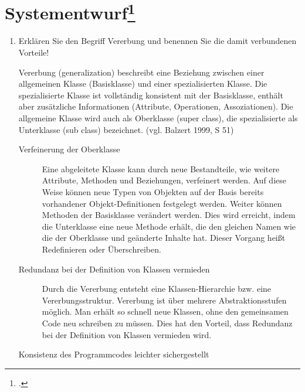 \documentclass{bschlangaul-aufgabe}
\begin{document}

\section{Systementwurf\footcite[Thema 1 Aufgabe 5]{examen:66112:2006:09}}

\begin{enumerate}


\item Erklären Sie den Begriff Vererbung  und benennen
Sie die damit verbundenen Vorteile!

\begin{bAntwort}
Vererbung (generalization) beschreibt eine Beziehung zwischen einer
allgemeinen Klasse (Basisklasse) und einer spezialisierten Klasse. Die
spezialisierte Klasse ist vollständig konsistent mit der Basisklasse,
enthält aber zusätzliche Informationen (Attribute, Operationen,
Assoziationen). Die allgemeine Klasse wird auch als Oberklasse (super
class), die spezialisierte als Unterklasse (sub class) bezeichnet.
(vgl. Balzert 1999, S 51)


\begin{description}
\item[Verfeinerung der Oberklasse]

Eine abgeleitete Klasse kann durch neue Bestandteile, wie weitere
Attribute, Methoden und Beziehungen, verfeinert werden. Auf diese Weise
können neue Typen von Objekten auf der Basis bereits vorhandener
Objekt-Definitionen festgelegt werden. Weiter können Methoden der
Basisklasse verändert werden. Dies wird erreicht, indem die Unterklasse
eine neue Methode erhält, die den gleichen Namen wie die der Oberklasse
und geänderte Inhalte hat. Dieser Vorgang heißt Redefinieren oder
Überschreiben.

\item[Redundanz bei der Definition von Klassen vermieden]

Durch die Vererbung entsteht eine Klassen-Hierarchie bzw. eine
Vererbungsstruktur. Vererbung ist über mehrere Abstraktionsstufen
möglich. Man erhält so schnell neue Klassen, ohne den gemeinsamen Code
neu schreiben zu müssen. Dies hat den Vorteil, dass Redundanz bei der
Definition von Klassen vermieden wird.

\item[Konsistenz des Programmcodes leichter sichergestellt]


\end{description}
\end{bAntwort}
\end{enumerate}
\end{document}
